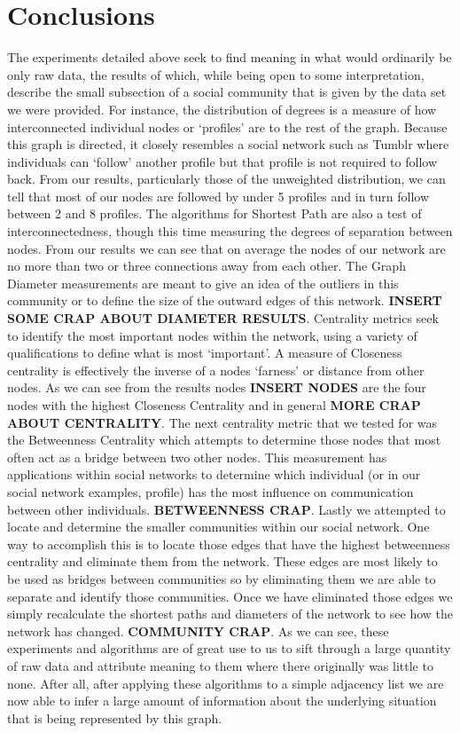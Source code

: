 \documentclass{article}
\newcommand{\placeholder}[1]{\textbf{\colorbox{red!50}{#1}}}
\begin{document}
\section{Conclusions}
The experiments detailed above seek to find meaning in what would ordinarily be only raw data, the results of which, while being open to some interpretation, describe the small subsection of a social community that is given by the data set we were provided. For instance, the distribution of degrees is a measure of how interconnected individual nodes or ‘profiles’ are to the rest of the graph. Because this graph is directed, it closely resembles a social network such as Tumblr where individuals can ‘follow’ another profile but that profile is not required to follow back. From our results, particularly those of the unweighted distribution, we can tell that most of our nodes are followed by under 5 profiles and in turn follow between 2 and 8 profiles. The algorithms for Shortest Path are also a test of interconnectedness, though this time measuring the degrees of separation between nodes. From our results we can see that on average the nodes of our network are no more than two or three connections away from each other. The Graph Diameter measurements are meant to give an idea of the outliers in this community or to define the size of the outward edges of this network. \placeholder{INSERT SOME CRAP ABOUT DIAMETER RESULTS}.  Centrality metrics seek to identify the most important nodes within the network, using a variety of qualifications to define what is most ‘important’.  A measure of Closeness centrality is effectively the inverse of a nodes ‘farness’ or distance from other nodes. As we can see from the results nodes \placeholder{INSERT NODES} are the four nodes with the highest Closeness Centrality and in general \placeholder{MORE CRAP ABOUT CENTRALITY}. The next centrality metric that we tested for was the Betweenness Centrality which attempts to determine those nodes that most often act as a bridge between two other nodes. This measurement has applications within social networks to determine which individual (or in our social network examples, profile) has the most influence on communication between other individuals. \placeholder{BETWEENNESS CRAP}.  Lastly we attempted to locate and determine the smaller communities within our social network. One way to accomplish this is to locate those edges that have the highest betweenness centrality and eliminate them from the network. These edges are most likely to be used as bridges between communities so by eliminating them we are able to separate and identify those communities.  Once we have eliminated those edges we simply recalculate the shortest paths and diameters of the network to see how the network has changed. \placeholder{COMMUNITY CRAP}.  As we can see, these experiments and algorithms are of great use to us to sift through a large quantity of raw data and attribute meaning to them where there originally was little to none. After all, after applying these algorithms to a simple adjacency list we are now able to infer a large amount of information about the underlying situation that is being represented by this graph.
\end{document}
